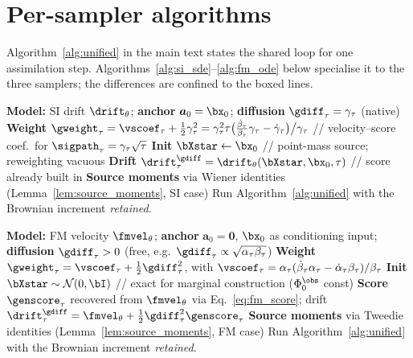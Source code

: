 \section{Per-sampler algorithms}\label{appendix:algorithms}
Algorithm~\ref{alg:unified} in the main text states the shared loop for one assimilation step. Algorithms~\ref{alg:si_sde}--\ref{alg:fm_ode} below specialise it to the three samplers; the differences are confined to the boxed lines.

\begin{algorithm}[ht]
\caption{Sampler 1 -- Stochastic interpolant SDE (native diffusion)}
\label{alg:si_sde}
\begin{algorithmic}[1]
\STATE \textbf{Model:} SI drift $\drift_\theta$; \textbf{anchor} $\bm a_0=\bx_0$; \textbf{diffusion} $\gdiff_\tau=\gamma_\tau$ (native)
\STATE \textbf{Weight} $\gweight_\tau = \vscoef_\tau + \tfrac12\gamma_\tau^2 = \gamma_\tau^2\tau\big(\tfrac{\dot\beta_\tau}{\beta_\tau}\gamma_\tau-\dot\gamma_\tau\big)\big/\gamma_\tau$ \hfill // velocity--score coef.\ for $\sigpath_\tau=\gamma_\tau\sqrt\tau$
\STATE \textbf{Init} $\bXstar\leftarrow\bx_0$ \hfill // point-mass source; reweighting vacuous
\STATE \textbf{Drift} $\drift^{\gdiff}_\tau=\drift_\theta(\bXstar,\bx_0,\tau)$ \hfill // score already built in
\STATE \textbf{Source moments} via Wiener identities (Lemma~\ref{lem:source_moments}, SI case)
\STATE Run Algorithm~\ref{alg:unified} with the Brownian increment \emph{retained}.
\end{algorithmic}
\end{algorithm}

\begin{algorithm}[ht]
\caption{Sampler 2 -- Diffusion-model SDE (lifted diffusion)}
\label{alg:fm_sde}
\begin{algorithmic}[1]
\STATE \textbf{Model:} FM velocity $\fmvel_\theta$; \textbf{anchor} $\bm a_0=\bm 0$, $\bx_0$ as conditioning input; \textbf{diffusion} $\gdiff_\tau>0$ (free, e.g.\ $\gdiff_\tau\propto\sqrt{\alpha_\tau\beta_\tau}$)
\STATE \textbf{Weight} $\gweight_\tau = \vscoef_\tau + \tfrac12\gdiff_\tau^2$, with $\vscoef_\tau=\alpha_\tau(\dot\beta_\tau\alpha_\tau-\dot\alpha_\tau\beta_\tau)/\beta_\tau$
\STATE \textbf{Init} $\bXstar\sim\mathcal{N}(0,\bI)$ \hfill // exact for marginal construction ($\Phi_0^{\obs}$ const)
\STATE \textbf{Score} $\genscore_\tau$ recovered from $\fmvel_\theta$ via Eq.~\eqref{eq:fm_score}; drift $\drift^{\gdiff}_\tau=\fmvel_\theta+\tfrac12\gdiff_\tau^2\genscore_\tau$
\STATE \textbf{Source moments} via Tweedie identities (Lemma~\ref{lem:source_moments}, FM case)
\STATE Run Algorithm~\ref{alg:unified} with the Brownian increment \emph{retained}.
\end{algorithmic}
\end{algorithm}

